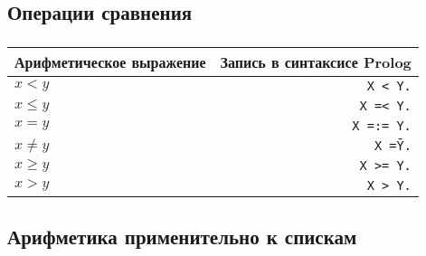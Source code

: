 \subsection{Операции сравнения}

\begin{frame}
	
	\frametitle{\insertsection}
	\framesubtitle{\insertsubsection}
	
	
	\begin{table}
		\centering
		\begin{tabular}{ l | r }
			\rowcolor{Gray}
			\textbf{Арифметическое выражение}   & \textbf{Запись в синтаксисе Prolog} \\
			\hline
			\rowcolor{LightGray}\( x < y \) & \texttt{X < Y.}  \\
			\rowcolor{LightGray}\( x\leqslant y \)  & \texttt{X =< Y.}   \\
			\rowcolor{LightGray}\( x = y \)  & \texttt{X =:= Y.}  \\
			\rowcolor{LightGray}\( x\neq y \)  & \texttt{X =\= Y.}  \\
			\rowcolor{LightGray}\( x\geqslant y \)  & \texttt{X >= Y.}  \\
			\rowcolor{LightGray}\( x > y \)  & \texttt{X > Y.} \\
		\end{tabular}
	\end{table}
	
	
\end{frame}


\subsection{Арифметика применительно к спискам}




